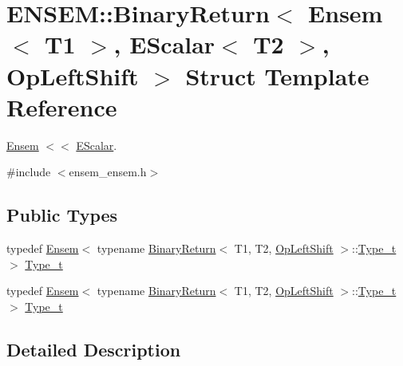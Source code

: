 \hypertarget{structENSEM_1_1BinaryReturn_3_01Ensem_3_01T1_01_4_00_01EScalar_3_01T2_01_4_00_01OpLeftShift_01_4}{}\section{E\+N\+S\+EM\+:\+:Binary\+Return$<$ Ensem$<$ T1 $>$, E\+Scalar$<$ T2 $>$, Op\+Left\+Shift $>$ Struct Template Reference}
\label{structENSEM_1_1BinaryReturn_3_01Ensem_3_01T1_01_4_00_01EScalar_3_01T2_01_4_00_01OpLeftShift_01_4}


\mbox{\hyperlink{classENSEM_1_1Ensem}{Ensem}} $<$$<$ \mbox{\hyperlink{classENSEM_1_1EScalar}{E\+Scalar}}.  




{\ttfamily \#include $<$ensem\+\_\+ensem.\+h$>$}

\subsection*{Public Types}
\begin{DoxyCompactItemize}
\item 
typedef \mbox{\hyperlink{classENSEM_1_1Ensem}{Ensem}}$<$ typename \mbox{\hyperlink{structENSEM_1_1BinaryReturn}{Binary\+Return}}$<$ T1, T2, \mbox{\hyperlink{structENSEM_1_1OpLeftShift}{Op\+Left\+Shift}} $>$\+::\mbox{\hyperlink{structENSEM_1_1BinaryReturn_3_01Ensem_3_01T1_01_4_00_01EScalar_3_01T2_01_4_00_01OpLeftShift_01_4_a5e6b49adaeee5d35d0f6e6065d277e16}{Type\+\_\+t}} $>$ \mbox{\hyperlink{structENSEM_1_1BinaryReturn_3_01Ensem_3_01T1_01_4_00_01EScalar_3_01T2_01_4_00_01OpLeftShift_01_4_a5e6b49adaeee5d35d0f6e6065d277e16}{Type\+\_\+t}}
\item 
typedef \mbox{\hyperlink{classENSEM_1_1Ensem}{Ensem}}$<$ typename \mbox{\hyperlink{structENSEM_1_1BinaryReturn}{Binary\+Return}}$<$ T1, T2, \mbox{\hyperlink{structENSEM_1_1OpLeftShift}{Op\+Left\+Shift}} $>$\+::\mbox{\hyperlink{structENSEM_1_1BinaryReturn_3_01Ensem_3_01T1_01_4_00_01EScalar_3_01T2_01_4_00_01OpLeftShift_01_4_a5e6b49adaeee5d35d0f6e6065d277e16}{Type\+\_\+t}} $>$ \mbox{\hyperlink{structENSEM_1_1BinaryReturn_3_01Ensem_3_01T1_01_4_00_01EScalar_3_01T2_01_4_00_01OpLeftShift_01_4_a5e6b49adaeee5d35d0f6e6065d277e16}{Type\+\_\+t}}
\end{DoxyCompactItemize}


\subsection{Detailed Description}
